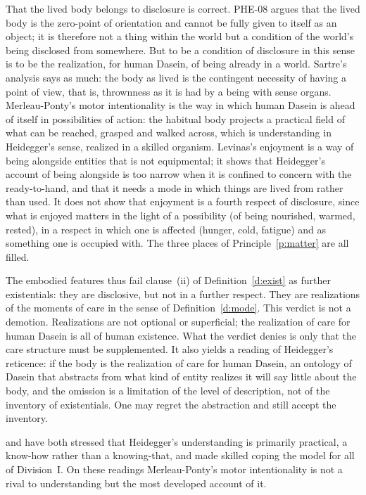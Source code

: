 \documentclass{situationist-preprint}
\begin{document}
That the lived body belongs to disclosure is correct. PHE-08 argues that the lived body is the zero-point of orientation and cannot be fully given to itself as an object; it is therefore not a thing within the world but a condition of the world's being disclosed from somewhere. But to be a condition of disclosure in this sense is to be the realization, for human Dasein, of being already in a world. Sartre's analysis says as much: the body as lived is the contingent necessity of having a point of view, that is, thrownness as it is had by a being with sense organs. Merleau-Ponty's motor intentionality is the way in which human Dasein is ahead of itself in possibilities of action: the habitual body projects a practical field of what can be reached, grasped and walked across, which is understanding in Heidegger's sense, realized in a skilled organism. Levinas's enjoyment is a way of being alongside entities that is not equipmental; it shows that Heidegger's account of being alongside is too narrow when it is confined to concern with the ready-to-hand, and that it needs a mode in which things are lived from rather than used. It does not show that enjoyment is a fourth respect of disclosure, since what is enjoyed matters in the light of a possibility (of being nourished, warmed, rested), in a respect in which one is affected (hunger, cold, fatigue) and as something one is occupied with. The three places of Principle~\ref{p:matter} are all filled.

The embodied features thus fail clause~(ii) of Definition~\ref{d:exist} as further existentials: they are disclosive, but not in a further respect. They are realizations of the moments of care in the sense of Definition~\ref{d:mode}. This verdict is not a demotion. Realizations are not optional or superficial; the realization of care for human Dasein is all of human existence. What the verdict denies is only that the care structure must be supplemented. It also yields a reading of Heidegger's reticence: if the body is the realization of care for human Dasein, an ontology of Dasein that abstracts from what kind of entity realizes it will say little about the body, and the omission is a limitation of the level of description, not of the inventory of existentials. One may regret the abstraction and still accept the inventory.

\citet{Carman2003} and \citet{Wrathall2010} have both stressed that Heidegger's understanding is primarily practical, a know-how rather than a knowing-that, and \citet{Dreyfus1991} made skilled coping the model for all of Division~I. On these readings Merleau-Ponty's motor intentionality is not a rival to understanding but the most developed account of it.
\end{document}
